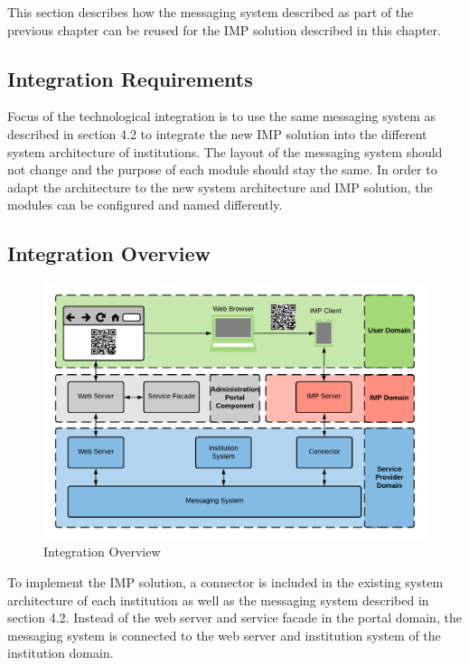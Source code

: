 This section describes how the messaging system described as part of the previous chapter can be reused for the IMP solution described in this chapter.

\subsection{Integration Requirements}

Focus of the technological integration is to use the same messaging system as described in section 4.2 to integrate the new IMP solution into the different system architecture of institutions. The layout of the messaging system should not change and the purpose of each module should stay the same. In order to adapt the architecture to the new system architecture and IMP solution, the modules can be configured and named differently.

\subsection{Integration Overview}

\begin{figure}[H]
    \centering
    \includegraphics[scale=0.6]{Diagrams/Integration Architecture 2/Technological Integration/1. Integration Overview.pdf}
    \caption{Integration Overview}
    \label{integration2:integration_overview}
\end{figure}

To implement the IMP solution, a connector is included in the existing system architecture of each institution as well as the messaging system described in section 4.2. Instead of the web server and service facade in the portal domain, the messaging system is connected to the web server and institution system of the institution domain.

